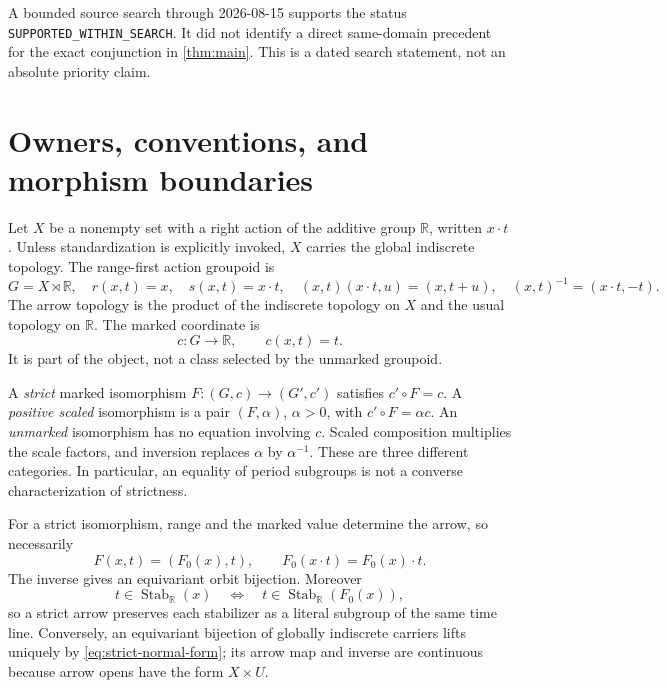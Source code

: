 \documentclass[11pt]{article}
\theoremstyle{definition}
\newcommand{\R}{\mathbb R}
\newcommand{\Stab}{\operatorname{Stab}}
\begin{document}
A bounded source search through 2026-08-15 supports the status
{\small\texttt{SUPPORTED\_WITHIN\_SEARCH}}.  It did not identify a direct
same-domain precedent for the exact conjunction in \cref{thm:main}.  This is
a dated search statement, not an absolute priority claim.

\section{Owners, conventions, and morphism boundaries}
\label{sec:conventions}

Let $X$ be a nonempty set with a right action of the additive group $\R$,
written $x\mathbin{\cdot}t$.  Unless standardization is explicitly invoked,
$X$ carries the global indiscrete topology.  The range-first action groupoid
is
\begin{equation}
\label{eq:groupoid-operations}
 G=X\rtimes\R,\quad
 r(x,t)=x,\quad s(x,t)=x\mathbin{\cdot}t,\quad
 (x,t)(x\mathbin{\cdot}t,u)=(x,t+u),\quad
 (x,t)^{-1}=(x\mathbin{\cdot}t,-t).
\end{equation}
The arrow topology is the product of the indiscrete topology on $X$ and the
usual topology on $\R$.  The marked coordinate is
\begin{equation}
\label{eq:mark}
 c:G\longrightarrow\R,\qquad c(x,t)=t.
\end{equation}
It is part of the object, not a class selected by the unmarked groupoid.

A \emph{strict} marked isomorphism $F:(G,c)\to(G',c')$ satisfies
$c'\circ F=c$.  A \emph{positive scaled} isomorphism is a pair
$(F,\alpha)$, $\alpha>0$, with $c'\circ F=\alpha c$.  An \emph{unmarked}
isomorphism has no equation involving $c$.  Scaled composition multiplies
the scale factors, and inversion replaces $\alpha$ by $\alpha^{-1}$.
These are three different categories.  In particular, an equality of
period subgroups is not a converse characterization of strictness.

For a strict isomorphism, range and the marked value determine the arrow, so
necessarily
\begin{equation}
\label{eq:strict-normal-form}
 F(x,t)=(F_0(x),t),\qquad
 F_0(x\mathbin{\cdot}t)=F_0(x)\mathbin{\cdot}t.
\end{equation}
The inverse gives an equivariant orbit bijection.  Moreover
\begin{equation}
\label{eq:stabilizer-strict}
 t\in\Stab_{\R}(x)
 \quad\Longleftrightarrow\quad
 t\in\Stab_{\R}(F_0(x)),
\end{equation}
so a strict arrow preserves each stabilizer as a literal subgroup of the
same time line.  Conversely, an equivariant bijection of globally
indiscrete carriers lifts uniquely by \cref{eq:strict-normal-form}; its
arrow map and inverse are continuous because arrow opens have the form
$X\times U$.
\end{document}
